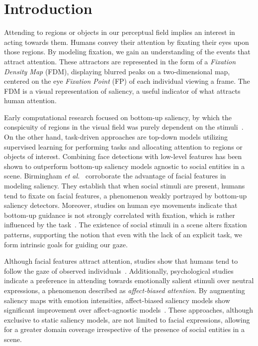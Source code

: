 \documentclass{article}
\begin{document}
\section{Introduction}

Attending to regions or objects in our perceptual field implies an interest in acting towards them. Humans convey their attention by fixating their eyes upon those regions. By modeling fixation, we gain an understanding of the events that attract attention. These attractors are represented in the form of a \textit{Fixation Density Map} (FDM),
displaying blurred peaks on a two-dimensional map, centered on the eye \textit{Fixation Point} (FP) of each individual viewing a frame. The FDM is a visual representation of saliency, a useful indicator of what attracts human attention. 

Early computational research focused on bottom-up saliency, by which the conspicuity of regions in the visual field was purely dependent on the stimuli~\cite{itti2001computational,bruce2009saliency}. On the other hand, task-driven approaches are top-down models utilizing supervised learning for performing tasks and allocating attention to regions or objects of interest. Combining face detections with low-level features 
has been shown to outperform bottom-up saliency models agnostic to social entities in a scene. Birmingham \textit{et al.}~ corroborate the advantage of facial features in modeling saliency. They establish that when social stimuli are present, humans tend to fixate on facial features, a phenomenon weakly portrayed by bottom-up saliency detectors. 
Moreover, studies on human eye movements indicate that bottom-up guidance is not strongly correlated with fixation, which is rather influenced by the task~\cite{foulsham2011modeling}. The existence of social stimuli in a scene alters fixation patterns, supporting the notion that even with the lack of an explicit task, we form intrinsic goals for guiding our gaze.

Although facial features attract attention, studies show that humans tend to follow the gaze of observed individuals~\cite{bylinskii2016should}.
Additionally, psychological studies~\cite{pritsch2017perception} 
indicate a preference in attending towards emotionally salient stimuli over neutral expressions, a phenomenon described as \textit{affect-biased attention}. 
By augmenting saliency maps with emotion intensities, affect-biased saliency models show significant improvement over affect-agnostic models~\cite{fan2018emotional,cordel2019emotion}. These approaches, although exclusive to static saliency models, are not limited to facial expressions, allowing for a greater domain coverage irrespective of the presence of social entities in a scene. 
\end{document}
